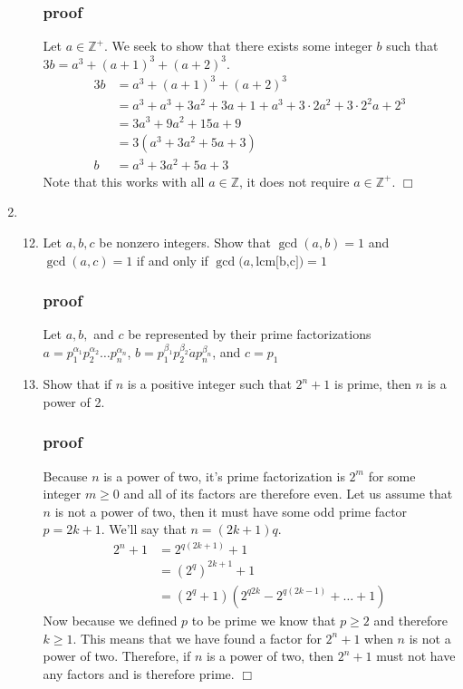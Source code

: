 \documentclass[letterpaper]{article}
\begin{document}
\begin{enumerate}
\begin{enumerate}
\subsubsection*{proof}
Let $a\in\mathbb{Z}^+$. We seek to show that there exists some integer $b$ such that $3b=a^3+(a+1)^3+(a+2)^3$.
\begin{align*}
  3b&=a^3+(a+1)^3+(a+2)^3\\
  &=a^3+a^3+3a^2+3a+1+a^3+3\cdot2a^2+3\cdot2^2a+2^3\\
  &=3a^3+9a^2+15a+9\\
  &=3(a^3+3a^2+5a+3)\\
  b&=a^3+3a^2+5a+3
\end{align*}
Note that this works with all $a\in\mathbb{Z}$, it does not require $a\in\mathbb{Z}^+$. $\Box$
\end{enumerate}
\item
\begin{enumerate}
\setcounter{enumii}{11}
\item
Let $a,b,c$ be nonzero integers. Show that $\gcd(a,b)=1$ and $\gcd(a,c)=1$ if and only if $\gcd(a,\text{lcm[b,c])}=1$
\subsubsection*{proof}
Let $a,b,$ and $c$ be represented by their prime factorizations $a=p_1^{\alpha_1}p_2^{\alpha_2}\dots p_n^{\alpha_n}$, $b=p_1^{\beta_1}p_2^{\beta_2}\dot a p_n^{\beta_n}$, and $c=p_1$
\setcounter{enumii}{22}
\item
Show that if $n$ is a positive integer such that $2^n+1$ is prime, then $n$ is a power of 2.
\subsubsection*{proof}
Because $n$ is a power of two, it's prime factorization is $2^m$ for some integer $m\ge 0$ and all of its factors are therefore even. Let us assume that $n$ is not a power of two, then it must have some odd prime factor $p=2k+1$. We'll say that $n=(2k+1)q$.
\begin{align*}
  2^n+1&=2^{q(2k+1)}+1\\
  &=(2^q)^{2k+1}+1\\
  &=(2^q+1)(2^{q2k}-2^{q(2k-1)}+\dots+1)
\end{align*}
Now because we defined $p$ to be prime we know that $p\ge 2$ and therefore $k\ge1$. This means that we have found a factor for $2^n+1$ when $n$ is not a power of two. Therefore, if $n$ is a power of two, then $2^n+1$ must not have any factors and is therefore prime. $\Box$
\end{enumerate}
\end{enumerate}
\end{document}
